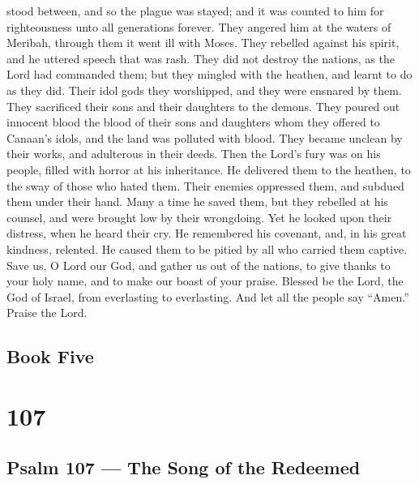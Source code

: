 stood between, and so the plague was stayed;  and it was
counted to him for righteousness unto all generations forever.
 They angered him at the waters of Meribah, through them it
went ill with Moses.  They rebelled against his spirit, and
he uttered speech that was rash.  They did not destroy the
nations, as the Lord had commanded them;  but they mingled
with the heathen, and learnt to do as they did.  Their idol
gods they worshipped, and they were ensnared by them.  They
sacrificed their sons and their daughters to the demons. 
They poured out innocent blood the blood of their sons and daughters
whom they offered to Canaan's idols, and the land was polluted with
blood.  They became unclean by their works, and adulterous
in their deeds.  Then the Lord's fury was on his people,
filled with horror at his inheritance.  He delivered them
to the heathen, to the sway of those who hated them.  Their
enemies oppressed them, and subdued them under their hand. 
Many a time he saved them, but they rebelled at his counsel, and were
brought low by their wrongdoing.  Yet he looked upon their
distress, when he heard their cry.  He remembered his
covenant, and, in his great kindness, relented.  He caused
them to be pitied by all who carried them captive.  Save
us, O Lord our God, and gather us out of the nations, to give thanks to
your holy name, and to make our boast of your praise. 
Blessed be the Lord, the God of Israel, from everlasting to everlasting.
And let all the people say ``Amen.'' Praise the Lord.

\hypertarget{book-five}{%
\subsection{Book Five}\label{book-five}}

\hypertarget{section-106}{%
\section{107}\label{section-106}}

\hypertarget{psalm-107-the-song-of-the-redeemed}{%
\subsection{Psalm 107 --- The Song of the
Redeemed}\label{psalm-107-the-song-of-the-redeemed}}

